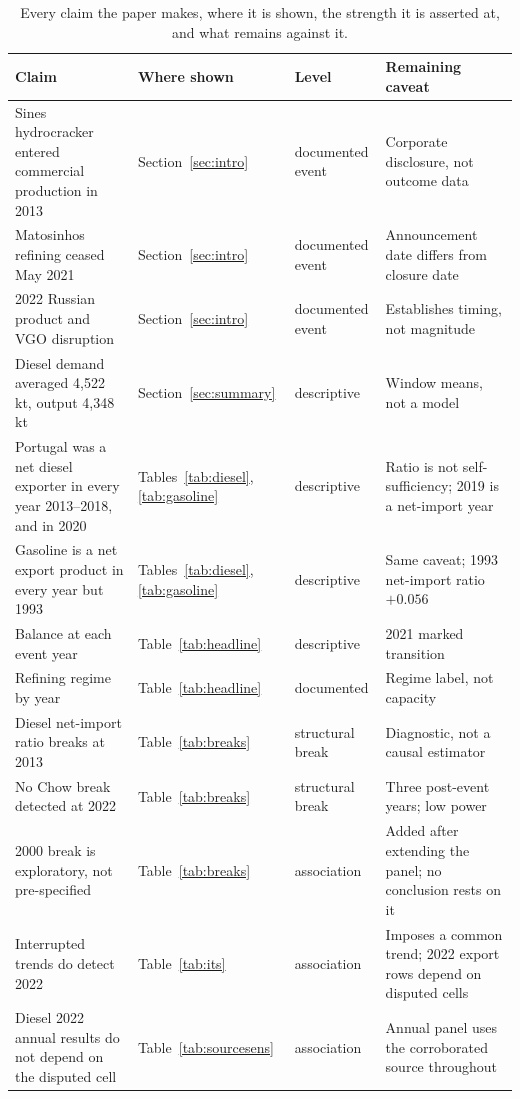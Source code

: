 \documentclass[11pt,a4paper]{article}
\begin{document}
\small
\begin{longtable}{L{4.1cm}L{3.5cm}L{2.2cm}L{4.4cm}}
\caption{Every claim the paper makes, where it is shown, the strength it is asserted at, and
what remains against it.\label{tab:claims}}\\
\toprule
\textbf{Claim} & \textbf{Where shown} & \textbf{Level} & \textbf{Remaining caveat} \\
\midrule
\endhead
Sines hydrocracker entered commercial production in 2013 & Section~\ref{sec:intro} & documented event & Corporate disclosure, not outcome data \\
Matosinhos refining ceased May 2021 & Section~\ref{sec:intro} & documented event & Announcement date differs from closure date \\
2022 Russian product and VGO disruption & Section~\ref{sec:intro} & documented event & Establishes timing, not magnitude \\
Diesel demand averaged 4{,}522 kt, output 4{,}348 kt & Section~\ref{sec:summary} & descriptive & Window means, not a model \\
Portugal was a net diesel exporter in every year 2013--2018, and in 2020 & Tables~\ref{tab:diesel}, \ref{tab:gasoline} & descriptive & Ratio is not self-sufficiency; 2019 is a net-import year \\
Gasoline is a net export product in every year but 1993 & Tables~\ref{tab:diesel}, \ref{tab:gasoline} & descriptive & Same caveat; 1993 net-import ratio $+0.056$ \\
Balance at each event year & Table~\ref{tab:headline} & descriptive & 2021 marked transition \\
Refining regime by year & Table~\ref{tab:headline} & documented & Regime label, not capacity \\
Diesel net-import ratio breaks at 2013 & Table~\ref{tab:breaks} & structural break & Diagnostic, not a causal estimator \\
No Chow break detected at 2022 & Table~\ref{tab:breaks} & structural break & Three post-event years; low power \\
2000 break is exploratory, not pre-specified & Table~\ref{tab:breaks} & association & Added after extending the panel; no conclusion rests on it \\
Interrupted trends do detect 2022 & Table~\ref{tab:its} & association & Imposes a common trend; 2022 export rows depend on disputed cells \\
Diesel 2022 annual results do not depend on the disputed cell & Table~\ref{tab:sourcesens} & association & Annual panel uses the corroborated source throughout \\

\end{longtable}
\end{document}
